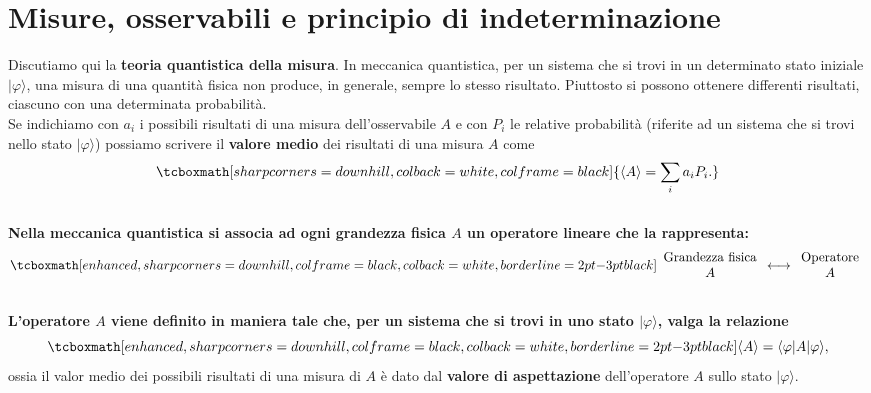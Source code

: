 \chapter[Misure e osservabili]{Misure, osservabili e principio di indeterminazione}
Discutiamo qui la \textbf{teoria quantistica della misura}. In meccanica quantistica, per un sistema che si trovi in un determinato stato iniziale $\vert \varphi \rangle$, una misura di una quantità fisica non produce, in generale, sempre lo stesso risultato. Piuttosto si possono ottenere differenti risultati, ciascuno con una determinata probabilità.\\

Se indichiamo con $a_i$ i possibili risultati di una misura dell'osservabile $A$ e con $P_i$ le relative probabilità (riferite ad un sistema che si trovi nello stato $\vert \varphi \rangle$) possiamo scrivere il \textbf{valore medio} dei risultati di una misura $A$ come
	\begin{equation}
		\tcboxmath[sharp corners=downhill, colback=white, colframe=black]{
			\langle A \rangle = \sum _i a_i P_i.
			}
	\end{equation}
\\

\textbf{Nella meccanica quantistica si associa ad ogni grandezza fisica $A$ un operatore lineare che la rappresenta:}
	\begin{equation}
		\tcboxmath[enhanced, sharp corners=downhill, colframe=black, colback=white, borderline={2pt}{-3pt}{black}]{
			\begin{array}{c}
			\textrm{Grandezza fisica}\\
			A
			\end{array}
			\longleftrightarrow
			\begin{array}{c}
			\textrm{Operatore}\\
			A
			\end{array}
			}
	\end{equation}
\\

\textbf{L'operatore $A$ viene definito in maniera tale che, per un sistema che si trovi in uno stato $\vert \varphi \rangle $, valga la relazione}
	\begin{equation}
		\tcboxmath[enhanced, sharp corners=downhill, colframe=black, colback=white, borderline={2pt}{-3pt}{black}]{
			\langle A \rangle = \langle \varphi \vert A \vert \varphi \rangle,
			}
	\end{equation}
ossia il valor medio dei possibili risultati di una misura di $A$ è dato dal \textbf{valore di aspettazione} dell'operatore $A$ sullo stato $\vert \varphi \rangle$.\\


